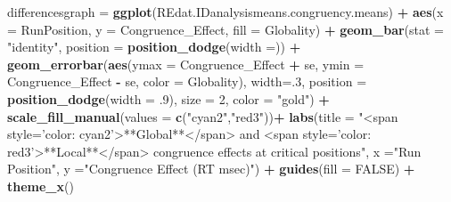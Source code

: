 \documentclass[
]{article}
\newenvironment{Shaded}{\begin{snugshade}}{\end{snugshade}}
\newcommand{\DataTypeTok}[1]{\textcolor[rgb]{0.13,0.29,0.53}{#1}}
\newcommand{\DecValTok}[1]{\textcolor[rgb]{0.00,0.00,0.81}{#1}}
\newcommand{\FloatTok}[1]{\textcolor[rgb]{0.00,0.00,0.81}{#1}}
\newcommand{\KeywordTok}[1]{\textcolor[rgb]{0.13,0.29,0.53}{\textbf{#1}}}
\newcommand{\NormalTok}[1]{#1}
\newcommand{\OperatorTok}[1]{\textcolor[rgb]{0.81,0.36,0.00}{\textbf{#1}}}
\newcommand{\OtherTok}[1]{\textcolor[rgb]{0.56,0.35,0.01}{#1}}
\newcommand{\StringTok}[1]{\textcolor[rgb]{0.31,0.60,0.02}{#1}}
\begin{document}
\begin{Shaded}
\begin{Highlighting}[]
\NormalTok{differencesgraph =}\StringTok{ }\KeywordTok{ggplot}\NormalTok{(REdat.IDanalysismeans.congruency.means) }\OperatorTok{+}
\StringTok{  }\KeywordTok{aes}\NormalTok{(}\DataTypeTok{x =}\NormalTok{ RunPosition, }\DataTypeTok{y =}\NormalTok{ Congruence_Effect, }\DataTypeTok{fill =}\NormalTok{ Globality) }\OperatorTok{+}
\StringTok{  }\KeywordTok{geom_bar}\NormalTok{(}\DataTypeTok{stat =} \StringTok{"identity"}\NormalTok{, }\DataTypeTok{position =} \KeywordTok{position_dodge}\NormalTok{(}\DataTypeTok{width =}\NormalTok{)) }\OperatorTok{+}
\StringTok{  }\KeywordTok{geom_errorbar}\NormalTok{(}\KeywordTok{aes}\NormalTok{(}\DataTypeTok{ymax =}\NormalTok{ Congruence_Effect }\OperatorTok{+}\StringTok{ }\NormalTok{se, }
                    \DataTypeTok{ymin =}\NormalTok{ Congruence_Effect }\OperatorTok{-}\StringTok{ }\NormalTok{se,}
                    \DataTypeTok{color =}\NormalTok{ Globality), }
                \DataTypeTok{width=}\NormalTok{.}\DecValTok{3}\NormalTok{,}
                \DataTypeTok{position =} \KeywordTok{position_dodge}\NormalTok{(}\DataTypeTok{width =} \FloatTok{.9}\NormalTok{),}
                \DataTypeTok{size =} \DecValTok{2}\NormalTok{,}
                \DataTypeTok{color =} \StringTok{"gold"}\NormalTok{) }\OperatorTok{+}
\StringTok{  }\KeywordTok{scale_fill_manual}\NormalTok{(}\DataTypeTok{values =} \KeywordTok{c}\NormalTok{(}\StringTok{"cyan2"}\NormalTok{,}\StringTok{"red3"}\NormalTok{))}\OperatorTok{+}
\StringTok{  }\KeywordTok{labs}\NormalTok{(}\DataTypeTok{title =} \StringTok{"<span style='color: cyan2'>**Global**</span> and <span style='color: red3'>**Local**</span> congruence effects at critical positions"}\NormalTok{,}
       \DataTypeTok{x =}\StringTok{"Run Position"}\NormalTok{, }
       \DataTypeTok{y =}\StringTok{"Congruence Effect (RT msec)"}\NormalTok{) }\OperatorTok{+}
\StringTok{   }\KeywordTok{guides}\NormalTok{(}\DataTypeTok{fill =} \OtherTok{FALSE}\NormalTok{) }\OperatorTok{+}
\StringTok{  }\KeywordTok{theme_x}\NormalTok{()}
\end{Highlighting}
\end{Shaded}
\end{document}
